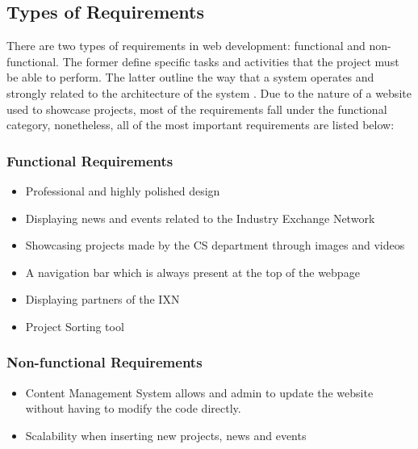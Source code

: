 \documentclass[fontsize=11pt]{extarticle}
\numberwithin{figure}{section} %
\providecommand{\tightlist}{%
  \setlength{\itemsep}{0pt}\setlength{\parskip}{0pt}}
\begin{document}
\hypertarget{types-of-requirements}{%
\subsection{Types of Requirements}\label{types-of-requirements}}

There are two types of requirements in web development: functional and
non-functional. The former define specific tasks and activities that the
project must be able to perform. The latter outline the way that a
system operates and strongly related to the architecture of the system
\cite{g5}. Due to the nature of a website used to showcase projects,
most of the requirements fall under the functional category,
nonetheless, all of the most important requirements are listed below:

\hypertarget{functional-requirements}{%
\subsubsection{Functional Requirements}\label{functional-requirements}}

\begin{itemize}
\tightlist
\item
  Professional and highly polished design
\item
  Displaying news and events related to the Industry Exchange Network
\item
  Showcasing projects made by the CS department through images and
  videos
\item
  A navigation bar which is always present at the top of the webpage
\item
  Displaying partners of the IXN
\item
  Project Sorting tool
\end{itemize}

\hypertarget{non-functional-requirements}{%
\subsubsection{Non-functional
Requirements}\label{non-functional-requirements}}

\begin{itemize}
\tightlist
\item
  Content Management System allows and admin to update the website
  without having to modify the code directly.
\item
  Scalability when inserting new projects, news and events
\end{itemize}
\end{document}
